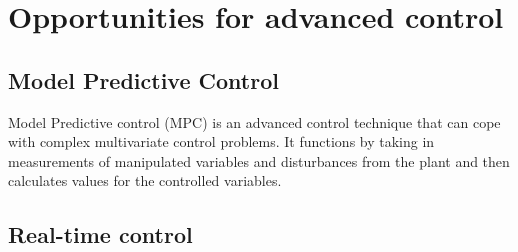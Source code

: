 \section{Opportunities for advanced control}

\subsection{Model Predictive Control}
Model Predictive control (MPC) is an advanced control technique that can cope with complex multivariate control problems. It functions by taking in measurements of manipulated variables and disturbances from the plant and then calculates values for the controlled variables. 

\subsection{Real-time control}